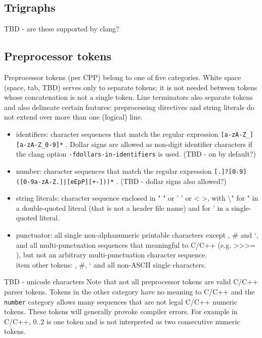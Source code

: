 \subsection{Trigraphs}

TBD - are these supported by clang?

\subsection{Preprocessor tokens}
Preprocessor tokens (per CPP) belong to one of five categories. White space (space, tab, TBD) serves only to separate tokens; it is not needed between tokens whose concatenation is not a single token. Line terminators also separate tokens and also delineate certain features: preprocessing directives and string literals do not extend over more than one (logical) line.
\begin{itemize}
	\item identifiers: character sequences that match the regular expression \texttt{[a-zA-Z\_][a-zA-Z\_0-9]*} . Dollar signs are allowed as non-digit identifier characters if the clang option \texttt{-fdollars-in-identifiers} is used. (TBD - on by default?)
	\item number: character sequences that match the regular expression \texttt{[.]?[0-9]([0-9a-zA-Z.]|[eEpP][+-]))*} . (TBD - dollar signs also allowed?)
	\item string literals: character sequence enclosed in " " or ' ' or < >, with \textbackslash " for " in a double-quoted literal (that is not a header file name) and \' for ' in a single-quoted literal.
	\item punctuator: all single non-alphanumeric printable characters except \@, \# and `, and all multi-punctuation sequences that meaningful to C/C++ (e.g. >>>= ), but not an arbitrary multi-punctuation character sequence.
	\\item other tokens: \@, \#, ` and all non-ASCII single characters.
\end{itemize}
TBD - unicode characters
Note that not all preprocessor tokens are valid C/C++ parser tokens. Tokens in the other category have no meaning to C/C++ and the \texttt{number} category allows many sequences that are not legal C/C++ numeric tokens. These tokens will generally provoke compiler errors. For example in C/C++, 0..2 is one token and is not interpreted as two consecutive numeric tokens.

